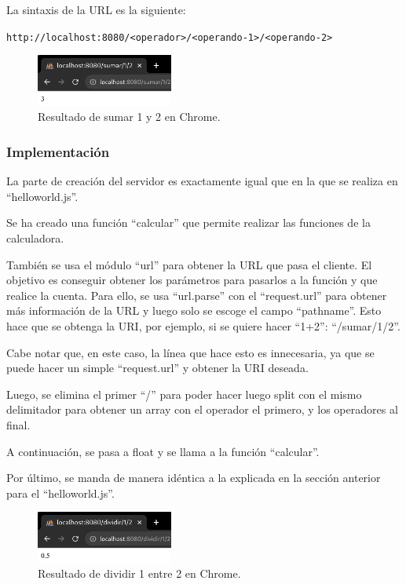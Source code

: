 \documentclass{article}
\begin{document}
La sintaxis de la URL es la siguiente: 

\verb|http://localhost:8080/<operador>/<operando-1>/<operando-2>|


\begin{figure}[H]
    \centering
    \includegraphics[width=0.4\textwidth]{images/rescalcnormal.png}
    \caption{Resultado de sumar 1 y 2 en Chrome.}
\end{figure}

\subsubsection{Implementación}
La parte de creación del servidor es exactamente igual que en la que se realiza en ``helloworld.js''.

Se ha creado una función ``calcular'' que permite realizar las funciones de la calculadora.

También se usa el módulo ``url'' para obtener la URL que pasa el cliente. El objetivo es conseguir obtener los parámetros para pasarlos a la función y que realice la cuenta. Para ello, se usa ``url.parse'' con el ``request.url'' para obtener más información de la URL y luego solo se escoge el campo ``pathname''. Esto hace que se obtenga la URI, por ejemplo, si se quiere hacer ``1+2'': ``/sumar/1/2''.

Cabe notar que, en este caso, la línea que hace esto es innecesaria, ya que se puede hacer un simple ``request.url'' y obtener la URI deseada.


Luego, se elimina el primer ``/'' para poder hacer luego split con el mismo delimitador para obtener un array con el operador el primero, y los operadores al final.

A continuación, se pasa a float y se llama a la función ``calcular''.

Por último, se manda de manera idéntica a la explicada en la sección anterior para el ``helloworld.js''.

\begin{figure}[H]
    \centering
    \includegraphics[width=0.4\textwidth]{images/dividircnormal.png}
    \caption{Resultado de dividir 1 entre 2 en Chrome.}
\end{figure}
\end{document}
